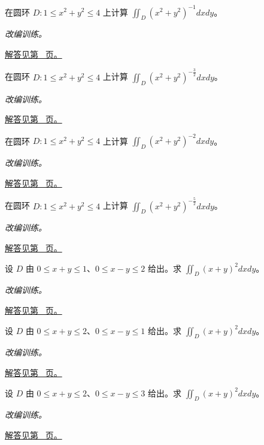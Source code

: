 \documentclass[12pt,fontset=fandol]{ctexart}
\begin{document}
\begin{example}[圆环上的径向负幂]\label{ex:c37q15}
在圆环 $D:1\le x^2+y^2\le4$ 上计算 $\iint_D(x^2+y^2)^{-1}dxdy$。
\par\textit{改编训练。}\par\hyperref[ans:c37q15]{解答见第~\pageref{ans:c37q15} 页。}
\end{example}
\begin{example}[圆环上的径向负幂]\label{ex:c37q16}
在圆环 $D:1\le x^2+y^2\le4$ 上计算 $\iint_D(x^2+y^2)^{-\frac{3}{2}}dxdy$。
\par\textit{改编训练。}\par\hyperref[ans:c37q16]{解答见第~\pageref{ans:c37q16} 页。}
\end{example}
\begin{example}[圆环上的径向负幂]\label{ex:c37q17}
在圆环 $D:1\le x^2+y^2\le4$ 上计算 $\iint_D(x^2+y^2)^{-2}dxdy$。
\par\textit{改编训练。}\par\hyperref[ans:c37q17]{解答见第~\pageref{ans:c37q17} 页。}
\end{example}
\begin{example}[圆环上的径向负幂]\label{ex:c37q18}
在圆环 $D:1\le x^2+y^2\le4$ 上计算 $\iint_D(x^2+y^2)^{-\frac{5}{2}}dxdy$。
\par\textit{改编训练。}\par\hyperref[ans:c37q18]{解答见第~\pageref{ans:c37q18} 页。}
\end{example}
\begin{example}[沿斜边界的线性换元]\label{ex:c37q19}
设 $D$ 由 $0\le x+y\le 1$、$0\le x-y\le 2$ 给出。求 $\displaystyle\iint_D(x+y)^2dxdy$。
\par\textit{改编训练。}\par\hyperref[ans:c37q19]{解答见第~\pageref{ans:c37q19} 页。}
\end{example}
\begin{example}[沿斜边界的线性换元]\label{ex:c37q20}
设 $D$ 由 $0\le x+y\le 2$、$0\le x-y\le 1$ 给出。求 $\displaystyle\iint_D(x+y)^2dxdy$。
\par\textit{改编训练。}\par\hyperref[ans:c37q20]{解答见第~\pageref{ans:c37q20} 页。}
\end{example}
\begin{example}[沿斜边界的线性换元]\label{ex:c37q21}
设 $D$ 由 $0\le x+y\le 2$、$0\le x-y\le 3$ 给出。求 $\displaystyle\iint_D(x+y)^2dxdy$。
\par\textit{改编训练。}\par\hyperref[ans:c37q21]{解答见第~\pageref{ans:c37q21} 页。}
\end{example}
\end{document}
